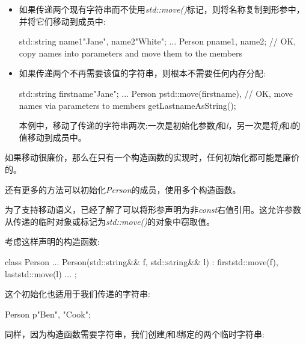 \begin{itemize}
  \item 如果传递两个现有字符串而不使用\textit{std::move()}标记，则将名称复制到形参中，并将它们移动到成员中:\par
\begin{codebox}[cpp]
  std::string name1{"Jane"}, name2{"White"};
  ...
  Person p{name1, name2}; // OK, copy names into parameters and move them to the members
\end{codebox}
  \item 如果传递两个不再需要该值的字符串，则根本不需要任何内存分配:
\begin{codebox}[cpp]
  std::string firstname{"Jane"};
  ...
  Person p{std::move(firstname), // OK, move names via parameters to members
    getLastnameAsString()};
\end{codebox}
  本例中，移动了传递的字符串两次:一次是初始化参数\textit{f}和\textit{l}，另一次是将\textit{f}和\textit{l}的值移动到成员中。
\end{itemize}

如果移动很廉价，那么在只有一个构造函数的实现时，任何初始化都可能是廉价的。\par


还有更多的方法可以初始化\textit{Person}的成员，使用多个构造函数。\par


为了支持移动语义，已经了解了可以将形参声明为非\textit{const}右值引用。这允许参数从传递的临时对象或标记为\textit{std::move()}的对象中窃取值。\par

考虑这样声明的构造函数:\par

\begin{codebox}[cpp]
class Person {
  ...
  Person(std::string&& f, std::string&& l)
  : first{std::move(f)}, last{std::move(l)} {
  }
  ...
};
\end{codebox}

这个初始化也适用于我们传递的字符串:\par

\begin{codebox}[cpp]
Person p{"Ben", "Cook"};
\end{codebox}

同样，因为构造函数需要字符串，我们创建\textit{f}和\textit{l}绑定的两个临时字符串:\par

